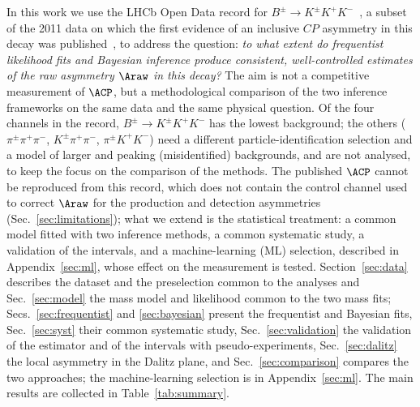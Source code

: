 In this work we use the LHCb Open Data record for $B^{\pm}\to K^{\pm}K^{+}K^{-}$~\cite{opendata_record,opendata_notebook}, a subset of the 2011 data on which the first evidence of an inclusive $CP$ asymmetry in this decay was published~\cite{lhcb_cpv_2013}, to address the question: \emph{to what extent do frequentist likelihood fits and Bayesian inference produce consistent, well-controlled estimates of the raw asymmetry $\Araw$ in this decay?} The aim is not a competitive measurement of $\ACP$, but a methodological comparison of the two inference frameworks on the same data and the same physical question. Of the four channels in the record, $B^\pm\to K^\pm K^+K^-$ has the lowest background; the others ($\pi^\pm\pi^+\pi^-$, $K^\pm\pi^+\pi^-$, $\pi^\pm K^+K^-$) need a different particle-identification selection and a model of larger and peaking (misidentified) backgrounds, and are not analysed, to keep the focus on the comparison of the methods. The published $\ACP$ cannot be reproduced from this record, which does not contain the control channel used to correct $\Araw$ for the production and detection asymmetries (Sec.~\ref{sec:limitations}); what we extend is the statistical treatment: a common model fitted with two inference methods, a common systematic study, a validation of the intervals, and a machine-learning (ML) selection, described in Appendix~\ref{sec:ml}, whose effect on the measurement is tested. Section~\ref{sec:data} describes the dataset and the preselection common to the analyses and Sec.~\ref{sec:model} the mass model and likelihood common to the two mass fits; Secs.~\ref{sec:frequentist} and \ref{sec:bayesian} present the frequentist and Bayesian fits, Sec.~\ref{sec:syst} their common systematic study, Sec.~\ref{sec:validation} the validation of the estimator and of the intervals with pseudo-experiments, Sec.~\ref{sec:dalitz} the local asymmetry in the Dalitz plane, and Sec.~\ref{sec:comparison} compares the two approaches; the machine-learning selection is in Appendix~\ref{sec:ml}. The main results are collected in Table~\ref{tab:summary}.


